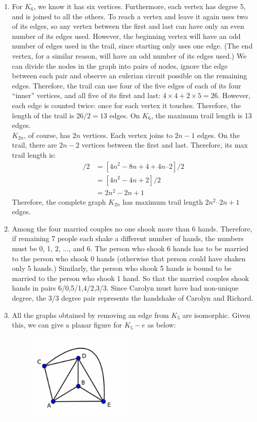 \documentclass{article}
\begin{document}
\begin{enumerate}
\item For $K_6$, we know it has six vertices. Furthermore, each vertex has degree 5, and is joined to all the others. To reach a vertex and leave it again uses two of its edges, so any vertex between the first and last can have only an even number of its edges used. However, the beginning vertex will have an odd number of edges used in the trail, since starting only uses one edge. (The end vertex, for a similar reason, will have an odd number of its edges used.)
We can divide the nodes in the graph into pairs of nodes, ignore the edge between each pair and observe an eulerian circuit possible on the remaining edges. Therefore, the trail can use four of the five edges of each of its four ``inner'' vertices, and all five of its first and last: $4\times 4 + 2\times 5=26$. However, each edge is counted twice: once for each vertex it touches. Therefore, the length of the trail is $26/2 = 13$ edges. On $K_6$, the maximum trail length is 13 edges. \\

$K_{2n}$, of course, has $2n$ vertices. Each vertex joins to $2n-1$ edges. On the trail, there are $2n-2$ vertices between the first and last. Therefore, its max trail length is:
\begin{align*}
[(2n-2)(2n-2) + 2(2n-1)]/2 &= [4n^2-8n +4 +4n – 2]/2 \\
&= [4n^2-4n + 2]/2 \\
&= 2n^2-2n + 1
\end{align*}
Therefore, the complete graph $K_{2n}$ has maximum trail length $2n^2 – 2n + 1$ edges.



\item Among the four married couples no one shook more than 6 hands. Therefore, if remaining 7 people each shake a different number of hands, the numbers must be 0, 1, 2, ..., and 6. The person who shook 6 hands has to be married to the person who shook 0 hands (otherwise that person could have shaken only 5 hands.) Similarly, the person who shook 5 hands is bound to be married to the person who shook 1 hand. So that the married couples shook hands in pairs 6/0,5/1,4/2,3/3. Since Carolyn must have had non-unique degree, the 3/3 degree pair represents the handshake of Carolyn and Richard. 




\item All the graphs obtained by removing an edge from $K_5$ are isomorphic. Given this, we can give a planar figure for $K_5-e$ as below:
\begin{figure}[H]
\centering
\includegraphics[width=5cm]{K5}
\end{figure}


\end{enumerate}
\end{document}
